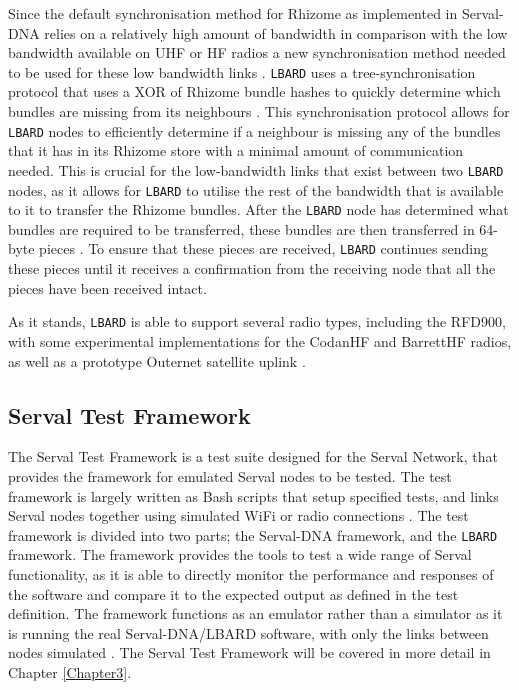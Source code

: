 Since the default synchronisation method for Rhizome as implemented in Serval-DNA relies on a relatively high amount of bandwidth in comparison with the low bandwidth available on UHF or HF radios a new synchronisation method needed to be used for these low bandwidth links \parencite{productizingServalMesh}.
\texttt{LBARD} uses a tree-synchronisation protocol that uses a XOR of Rhizome bundle hashes to quickly determine which bundles are missing from its neighbours \parencite{lbardDocumentation}.
This synchronisation protocol allows for \texttt{LBARD} nodes to efficiently determine if a neighbour is missing any of the bundles that it has in its Rhizome store with a minimal amount of communication needed.
This is crucial for the low-bandwidth links that exist between two \texttt{LBARD} nodes, as it allows for \texttt{LBARD} to utilise the rest of the bandwidth that is available to it to transfer the Rhizome bundles.
After the \texttt{LBARD} node has determined what bundles are required to be transferred, these bundles are then transferred in 64-byte pieces \parencite{lbardDocumentation}.
To ensure that these pieces are received, \texttt{LBARD} continues sending these pieces until it receives a confirmation from the receiving node that all the pieces have been received intact.

As it stands, \texttt{LBARD} is able to support several radio types, including the RFD900, with some experimental implementations for the CodanHF and BarrettHF radios, as well as a prototype Outernet satellite uplink \parencite{lbardDocumentation}.

\subsection{Serval Test Framework}
The Serval Test Framework is a test suite designed for the Serval Network, that provides the framework for emulated Serval nodes to be tested.
The test framework is largely written as Bash scripts that setup specified tests, and links Serval nodes together using simulated WiFi or radio connections \parencite{servalTestDocumentation}.
The test framework is divided into two parts; the Serval-DNA framework, and the \texttt{LBARD} framework.
The framework provides the tools to test a wide range of Serval functionality, as it is able to directly monitor the performance and responses of the software and compare it to the expected output as defined in the test definition.
The framework functions as an emulator rather than a simulator as it is running the real Serval-DNA/LBARD software, with only the links between nodes simulated \parencite{servalTestDocumentation}.
The Serval Test Framework will be covered in more detail in Chapter \ref{Chapter3}.

